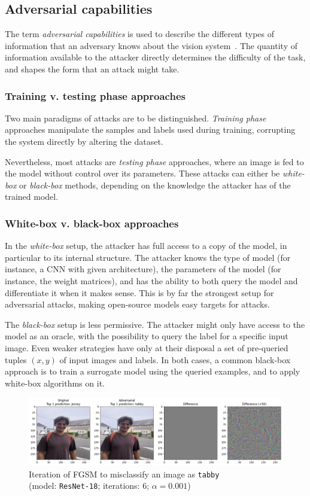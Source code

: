 \documentclass[twocolumn]{../cs-classes/cs-classes}
\begin{document}
\subsection{Adversarial capabilities}
The term \emph{adversarial capabilities} is used to describe the different types of information that an adversary knows about the vision system \cite{chakraborty2021survey}. The quantity of information available to the attacker directly determines the difficulty of the task, and shapes the form that an attack might take.

\subsubsection{Training v. testing phase approaches}
Two main paradigms of attacks are to be distinguished. \emph{Training phase} approaches manipulate the samples and labels used during training, corrupting the system directly by altering the dataset.

Nevertheless, most attacks are \emph{testing phase} approaches, where an image is fed to the model without control over its parameters. These attacks can either be \emph{white-box} or \emph{black-box} methods, depending on the knowledge the attacker has of the trained model.

\subsubsection{White-box v. black-box approaches}
In the \emph{white-box} setup, the attacker has full access to a copy of the model, in particular to its internal structure. The attacker knows the type of model (for instance, a CNN with given architecture), the parameters of the model (for instance, the weight matrices), and has the ability to both query the model and differentiate it when it makes sense. This is by far the strongest setup for adversarial attacks, making open-source models easy targets for attacks.

The \emph{black-box} setup is less permissive. The attacker might only have access to the model as an oracle, with the possibility to query the label for a specific input image. Even weaker strategies have only at their disposal a set of pre-queried tuples $(x, y)$ of input images and labels. In both cases, a common black-box approach is to train a surrogate model using the queried examples, and to apply white-box algorithms on it.

\begin{figure}[t]
    \centering
    \includegraphics[width=\linewidth]{fgsm-tabby.png}
    \caption{Iteration of FGSM to misclassify an image as \texttt{tabby}\\(model: \texttt{ResNet-18}; iterations: 6; $\alpha=0.001$)}
    \label{fig:fgsm-pg}
\end{figure}
\end{document}
